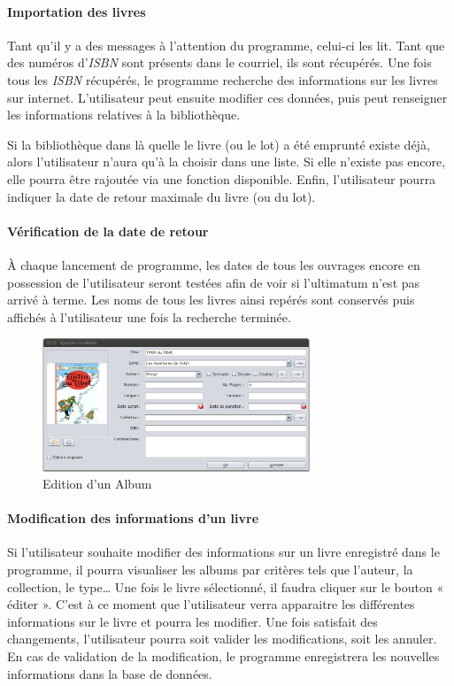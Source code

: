 \paragraph{Importation des livres}
Tant qu'il y a des messages à l'attention du programme, celui-ci les lit. 
Tant que des numéros d'\emph{ISBN} sont présents dans le courriel, ils sont récupérés. 
Une fois tous les \emph{ISBN} récupérés, le programme recherche des informations sur les livres sur internet.
L'utilisateur peut ensuite modifier ces données, puis peut renseigner les informations relatives à la bibliothèque. 

Si la bibliothèque dans là quelle le livre (ou le lot) a été emprunté existe déjà, 
alors l'utilisateur n'aura qu'à la choisir dans une liste. Si elle n'existe pas encore, elle pourra être rajoutée via une fonction disponible. 
Enfin, l'utilisateur pourra indiquer la date de retour maximale du livre (ou du lot).

\paragraph{Vérification de la date de retour}
À chaque lancement de programme, les dates de tous les ouvrages encore en possession de l'utilisateur seront testées afin de voir si l'ultimatum n'est pas arrivé à terme. 
Les noms de tous les livres ainsi repérés sont conservés puis affichés à l'utilisateur une fois la recherche terminée. 


\begin{figure}
\includegraphics[width=8cm]{../img/editionAlbum.png}
\caption{Edition d'un Album}
\end{figure}

\paragraph{Modification des informations d'un livre}
Si l'utilisateur souhaite modifier des informations sur un livre enregistré dans le programme, il pourra visualiser les albums par critères tels que l'auteur, la collection, le type…
Une fois le livre sélectionné, il faudra cliquer sur le bouton « éditer ».  
C'est à ce moment que l'utilisateur verra apparaitre les différentes informations sur le livre et pourra les modifier.
Une fois satisfait des changements, l'utilisateur pourra soit valider les modifications, soit les annuler. 
En cas de validation de la modification, le programme enregistrera les nouvelles informations dans la base de données.  
